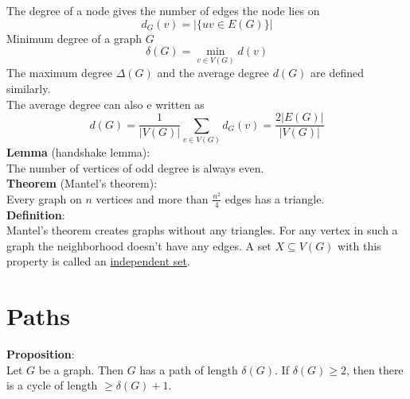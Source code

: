 \documentclass[a4paper, 12pt]{article}
\begin{document}
	The degree of a node gives the number of edges the node lies on \[d_G(v) = \left|\{uv \in E(G)\}\right|\]
	Minimum degree of a graph $G$ \[\delta(G) = \min_{v \in V(G)} d(v)\]
	The maximum degree $\Delta(G)$ and the average degree $d(G)$ are defined similarly.\\
	The average degree can also e written as \[d(G) = \frac{1}{\left|V(G)\right|} \sum_{v \in V(G)} d_G(v) = \frac{2\left|E(G)\right|}{\left|V(G)\right|}\]
	\textbf{Lemma} (handshake lemma):\\
	The number of vertices of odd degree is always even.\\
	\textbf{Theorem} (Mantel's theorem):\\
	Every graph on $n$ vertices and more than $\frac{n^2}{4}$ edges has a triangle.\\
	\textbf{Definition}:\\
	Mantel's theorem creates graphs without any triangles. For any vertex in such a graph the neighborhood doesn't have any edges. A set $X \subseteq V(G)$ with this property is called an \underline{independent set}. \\
	\section{Paths}
	\textbf{Proposition}:\\
	Let $G$ be a graph. Then $G$ has a path of length $\delta(G)$. If $\delta(G) \geq 2$, then there is a cycle of length $\geq \delta(G)+1$.\\
	
\end{document}
